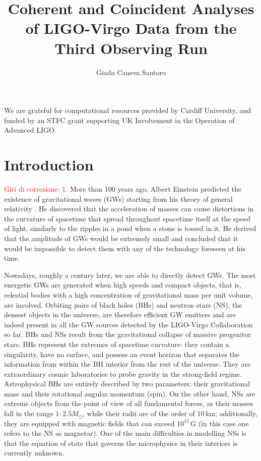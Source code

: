 \documentclass[binding=0.6cm, LaM]{sapthesis}
\title{Coherent and Coincident Analyses of LIGO-Virgo Data from the Third Observing Run}
\author{Giada Caneva Santoro}
\newcommand{\fpg}[1]{\textcolor{red}{#1} }
\begin{document}
\frontmatter
\maketitle
\dedication{Se non tengo presente l’universo, perdo il senso delle proporzioni. \\ Italo Calvino.}


\tableofcontents

\begin{acknowledgments}
We are grateful for computational resources provided by Cardiff University, and funded by an STFC grant supporting UK Involvement in the Operation of Advanced LIGO.
\end{acknowledgments}

\mainmatter 

\chapter*{Introduction}
\label{sec:intro}
%
\fpg{Giri di correzione: 1.}%
	More than 100 years ago, Albert Einstein predicted the existence of gravitational waves (GWs) starting from his theory of general relativity \cite{1,2}.
	He discovered that the acceleration of masses
	can cause distortions in the curvature of spacetime that 
        spread throughout spacetime itself at the speed of light, similarly to the ripples in a pond when a stone is tossed in it.
	He derived that the amplitude of GWs would be extremely small and concluded that it would be impossible to detect them with any of the technology foreseen at his time.

	Nowadays, roughly a century later, we are able to directly detect GWs.
	The most energetic GWs are generated when high speeds and compact objects, that is, 	
	celestial bodies with a high concentration of gravitational mass per unit volume, are involved.
	Orbiting pairs of black holes (BHs) and neutron stars (NS), the densest objects in the universe,
	are therefore efficient GW emitters and are indeed present in all the GW sources detected by the LIGO-Virgo Collaboration so far.
        BHs and NSs result from the gravitational collapse of massive progenitor stars.
        BHs represent the extremes of spacetime curvature:
        they contain a singularity, have no surface, and possess an event horizon that separates the information
        from within the BH interior from the rest of the universe.
        They are extraordinary cosmic laboratories to probe gravity in the strong-field regime.
        Astrophysical BHs are entirely described by two parameters: their gravitational mass and their rotational angular momentum (spin).
        On the other hand, NSs are extreme objects from the point of view of all fundamental forces, 
	as their masses fall in the range $1$--$2.5M_\odot$, while their radii are of the order of 10\,km; 
	additionally, they are equipped with magnetic fields that can exceed $10^{15}\,$G 
	(in this case one refers to the NS as magnetar). 
	One of the main difficulties in modelling NSs is that the equation of state that governs the microphysics in their interiors is currently unknown.
\end{document}
